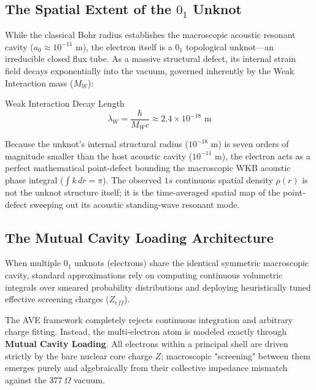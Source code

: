 \subsection{The Spatial Extent of the $0_1$ Unknot}
While the classical Bohr radius establishes the macroscopic acoustic resonant cavity ($a_0 \approx 10^{-11}\text{ m}$), the electron itself is a $0_1$ topological unknot---an irreducible closed flux tube. As a massive structural defect, its internal strain field decays exponentially into the vacuum, governed inherently by the Weak Interaction mass ($M_W$):
\begin{resultbox}{Weak Interaction Decay Length}
\begin{equation}
    \lambda_W = \frac{\hbar}{M_W c} \approx 2.4 \times 10^{-18}\text{ m}
\end{equation}
\end{resultbox}
Because the unknot's internal structural radius ($10^{-18}\text{ m}$) is seven orders of magnitude smaller than the host acoustic cavity ($10^{-11}\text{ m}$), the electron acts as a perfect mathematical point-defect bounding the macroscopic WKB acoustic phase integral ($\int k\,dr = \pi$). The observed $1s$ continuous spatial density $\rho(r)$ is not the unknot structure itself; it is the time-averaged spatial map of the point-defect sweeping out its acoustic standing-wave resonant mode.

\subsection{The Mutual Cavity Loading Architecture}

When multiple $0_1$ unknots (electrons) share the identical symmetric macroscopic cavity, standard approximations rely on computing continuous volumetric integrals over smeared probability distributions and deploying heuristically tuned effective screening charges ($Z_{eff}$). 

The AVE framework completely rejects continuous integration and arbitrary charge fitting. Instead, the multi-electron atom is modeled exactly through \textbf{Mutual Cavity Loading}. All electrons within a principal shell are driven strictly by the bare nuclear core charge $Z$; macroscopic "screening" between them emerges purely and algebraically from their collective impedance mismatch against the $377 \ \Omega$ vacuum.

